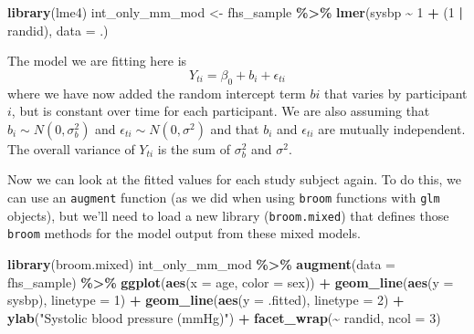 \documentclass[
]{book}
\newenvironment{Shaded}{\begin{snugshade}}{\end{snugshade}}
\newcommand{\AttributeTok}[1]{\textcolor[rgb]{0.13,0.29,0.53}{#1}}
\newcommand{\DecValTok}[1]{\textcolor[rgb]{0.00,0.00,0.81}{#1}}
\newcommand{\FunctionTok}[1]{\textcolor[rgb]{0.13,0.29,0.53}{\textbf{#1}}}
\newcommand{\NormalTok}[1]{#1}
\newcommand{\OtherTok}[1]{\textcolor[rgb]{0.56,0.35,0.01}{#1}}
\newcommand{\SpecialCharTok}[1]{\textcolor[rgb]{0.81,0.36,0.00}{\textbf{#1}}}
\newcommand{\StringTok}[1]{\textcolor[rgb]{0.31,0.60,0.02}{#1}}
\begin{document}
\begin{Shaded}
\begin{Highlighting}[]
\FunctionTok{library}\NormalTok{(lme4)}
\NormalTok{int\_only\_mm\_mod }\OtherTok{\textless{}{-}}\NormalTok{ fhs\_sample }\SpecialCharTok{\%\textgreater{}\%} 
  \FunctionTok{lmer}\NormalTok{(sysbp }\SpecialCharTok{\textasciitilde{}} \DecValTok{1} \SpecialCharTok{+}\NormalTok{ (}\DecValTok{1} \SpecialCharTok{|}\NormalTok{ randid), }\AttributeTok{data =}\NormalTok{ .) }
\end{Highlighting}
\end{Shaded}

The model we are fitting here is
\[
Y_{ti} = \beta_{0} + b_{i} + \epsilon_{ti}
\]
where we have now added the random intercept term \(b{i}\) that varies by participant
\(i\), but is constant over time for each participant. We are also assuming that
\(b_{i} \sim N(0,\sigma_{b}^2)\) and \(\epsilon_{ti} \sim N(0,\sigma^2)\) and that \(b_{i}\)
and \(\epsilon_{ti}\) are mutually independent. The overall variance of \(Y_{ti}\) is
the sum of \(\sigma_{b}^2\) and \(\sigma^2\).

Now we can look at the fitted values for each study subject again. To do this,
we can use an \texttt{augment} function (as we did when using \texttt{broom} functions with
\texttt{glm} objects), but we'll need to load a new library (\texttt{broom.mixed}) that defines
those \texttt{broom} methods for the model output from these mixed models.

\begin{Shaded}
\begin{Highlighting}[]
\FunctionTok{library}\NormalTok{(broom.mixed)}
\NormalTok{int\_only\_mm\_mod }\SpecialCharTok{\%\textgreater{}\%} 
  \FunctionTok{augment}\NormalTok{(}\AttributeTok{data =}\NormalTok{ fhs\_sample) }\SpecialCharTok{\%\textgreater{}\%} 
  \FunctionTok{ggplot}\NormalTok{(}\FunctionTok{aes}\NormalTok{(}\AttributeTok{x =}\NormalTok{ age, }\AttributeTok{color =}\NormalTok{ sex)) }\SpecialCharTok{+} 
  \FunctionTok{geom\_line}\NormalTok{(}\FunctionTok{aes}\NormalTok{(}\AttributeTok{y =}\NormalTok{ sysbp), }\AttributeTok{linetype =} \DecValTok{1}\NormalTok{) }\SpecialCharTok{+} 
  \FunctionTok{geom\_line}\NormalTok{(}\FunctionTok{aes}\NormalTok{(}\AttributeTok{y =}\NormalTok{ .fitted), }\AttributeTok{linetype =} \DecValTok{2}\NormalTok{) }\SpecialCharTok{+} 
  \FunctionTok{ylab}\NormalTok{(}\StringTok{"Systolic blood pressure (mmHg)"}\NormalTok{) }\SpecialCharTok{+} 
  \FunctionTok{facet\_wrap}\NormalTok{(}\SpecialCharTok{\textasciitilde{}}\NormalTok{ randid, }\AttributeTok{ncol =} \DecValTok{3}\NormalTok{)}
\end{Highlighting}
\end{Shaded}
\end{document}
